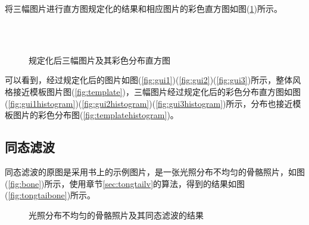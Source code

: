 \documentclass{hitreport}
\begin{document}
将三幅图片进行直方图规定化的结果和相应图片的彩色直方图如图(\ref{fig:guiguidinghua})所示。

\begin{figure}[htb]
	\centering
	\hspace{20pt}
	\\
	\hspace{20pt}
	\\
	\hspace{20pt}
	\caption{规定化后三幅图片及其彩色分布直方图}\label{fig:guiguidinghua}
\end{figure}

可以看到，经过规定化后的图片如图(\ref{fig:gui1})(\ref{fig:gui2})(\ref{fig:gui3})所示，整体风格接近模板图片图(\ref{fig:template})，三幅图片经过规定化后的彩色分布直方图如图(\ref{fig:gui1histogram})(\ref{fig:gui2histogram})(\ref{fig:gui3histogram})所示，分布也接近模板图片的彩色分布图(\ref{fig:templatehistogram})。

\subsection{同态滤波}

同态滤波的原图是采用书上的示例图片，是一张光照分布不均匀的骨骼照片，如图(\ref{fig:bone})所示，使用章节\ref{sec:tongtailv}的算法，得到的结果如图(\ref{fig:tongtaibone})所示。

\begin{figure}[htb]
	\centering
	\hspace{20pt}
	\caption{光照分布不均匀的骨骼照片及其同态滤波的结果}\label{fig:bone1}
\end{figure}
\end{document}
